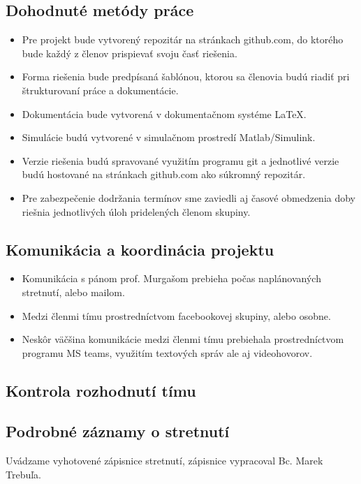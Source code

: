 \documentclass[../main.tex]{subfiles}
\begin{document}
    \subsection{Dohodnuté metódy práce}   
    	\begin{itemize}
    		\item Pre projekt bude vytvorený repozitár na stránkach github.com, do ktorého bude každý z členov prispievať svoju časť riešenia.
    		\item Forma riešenia bude predpísaná šablónou, ktorou sa členovia budú riadiť pri štrukturovaní práce a dokumentácie.
            \item Dokumentácia bude vytvorená v dokumentačnom systéme LaTeX.
            \item Simulácie budú vytvorené v simulačnom prostredí Matlab/Simulink.
            \item Verzie riešenia budú spravované využitím programu git a jednotlivé verzie budú hostované na stránkach github.com ako súkromný repozitár.
            \item Pre zabezpečenie dodržania termínov sme zaviedli aj časové obmedzenia doby riešnia jednotlivých úloh pridelených členom skupiny.
    	\end{itemize}

    \subsection{Komunikácia a koordinácia projektu}
    	\begin{itemize}
    		\item Komunikácia s pánom prof. Murgašom prebieha počas naplánovaných stretnutí, alebo mailom.
    		\item Medzi členmi tímu prostredníctvom facebookovej skupiny, alebo osobne. 
            \item Neskôr väčšina komunikácie medzi členmi tímu prebiehala prostredníctvom programu MS teams, využitím textových správ ale aj videohovorov.
    	\end{itemize}

    \subsection{Kontrola rozhodnutí tímu}
    
    \subsection{Podrobné záznamy o stretnutí}
    Uvádzame vyhotovené zápisnice stretnutí, zápisnice vypracoval Bc. Marek Trebuľa.

\end{document}
